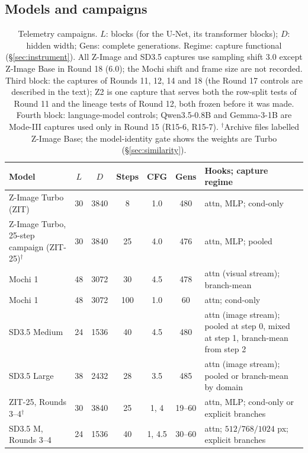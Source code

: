 \documentclass[11pt]{article}
\newcommand{\TT}{ZIT-25}%
\begin{document}
\subsection{Models and campaigns}
\begin{table}[!t]
\centering
\footnotesize
\renewcommand{\arraystretch}{0.92}
\caption{Telemetry campaigns. $L$: blocks (for the U-Net, its transformer blocks); $D$: hidden width; Gens: complete generations. Regime: capture functional (\S\ref{sec:instrument}). All Z-Image and SD3.5 captures use sampling shift $3.0$ except Z-Image Base in Round 18 ($6.0$); the Mochi shift and frame size are not recorded. Third block: the captures of Rounds 11, 12, 14 and 18 (the Round 17 controls are described in the text); Z2 is one capture that serves both the row-split tests of Round 11 and the lineage tests of Round 12, both frozen before it was made. Fourth block: language-model controls; Qwen3.5-0.8B and Gemma-3-1B are Mode-III captures used only in Round 15 (R15-6, R15-7). $^{\dagger}$Archive files labelled Z-Image Base; the model-identity gate shows the weights are Turbo (\S\ref{sec:similarity}).}
\label{tab:corpus}
\begin{tabularx}{\linewidth}{@{}>{\raggedright\arraybackslash}p{3.5cm}@{\hspace{4pt}}ccc@{\hspace{4pt}}c@{\hspace{4pt}}c@{\hspace{4pt}}L@{}}
\toprule
Model & $L$ & $D$ & Steps & CFG & Gens & Hooks; capture regime\\
\midrule
Z-Image Turbo (ZIT) & 30 & 3840 & 8 & 1.0 & 480 & attn, MLP; cond-only\\
Z-Image Turbo, 25-step campaign (\TT{})$^{\dagger}$ & 30 & 3840 & 25 & 4.0 & 476 & attn, MLP; pooled\\
Mochi 1 & 48 & 3072 & 30 & 4.5 & 478 & attn (visual stream); branch-mean\\
Mochi 1 & 48 & 3072 & 100 & 1.0 & 60 & attn; cond-only\\
SD3.5 Medium & 24 & 1536 & 40 & 4.5 & 480 & attn (image stream); pooled at step 0, mixed at step 1, branch-mean from step 2\\
SD3.5 Large & 38 & 2432 & 28 & 3.5 & 485 & attn (image stream); pooled or branch-mean by domain\\
\midrule
\TT{}, Rounds 3--4$^{\dagger}$ & 30 & 3840 & 25 & 1, 4 & 19--60 & attn, MLP; cond-only or explicit branches\\
SD3.5 M, Rounds 3--4 & 24 & 1536 & 40 & 1, 4.5 & 30--60 & attn; $512/768/1024$ px; explicit branches\\

\end{tabularx}
\end{table}
\end{document}
